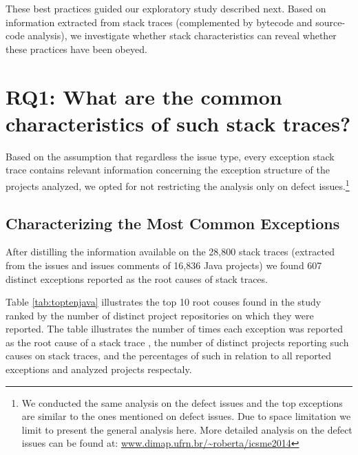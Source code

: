 \documentclass[conference]{IEEEtran}
\begin{document}
These best practices guided our exploratory study described next.
Based on information extracted from stack traces (complemented by
bytecode and source-code analysis), we investigate whether stack characteristics
can reveal whether these practices have been obeyed. 


\section{RQ1: What are the common characteristics of such stack traces?}


Based on the assumption that regardless the issue type, every exception stack
trace contains relevant information concerning the exception structure of the
projects analyzed, we opted for not restricting the analysis only on defect
issues.\footnote{We conducted the same analysis on the defect issues and the top
exceptions are similar to the ones mentioned on defect issues. Due to space
limitation we limit to present the general analysis here. More detailed analysis
on the defect issues can be found at:
\url{www.dimap.ufrn.br/~roberta/icsme2014}}

\subsection{Characterizing the Most Common Exceptions}

After distilling the information available on the 28,800 stack traces (extracted from the 
issues and issues comments of 16,836 Java projects) we found 607 distinct exceptions
reported as the root causes of stack traces.

Table \ref{tab:toptenjava} illustrates the top 10 root couses found in the study ranked by the number of distinct
project repositories on which they were reported. The table illustrates the
number of times each exception was reported as the root cause of a stack trace
, the number of distinct projects reporting such causes on stack traces, and the percentages of
such in relation to all reported exceptions and analyzed projects respectaly.
\end{document}
